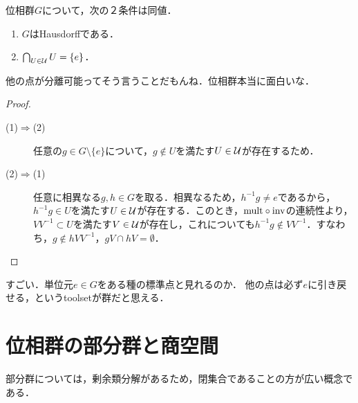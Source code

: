 \documentclass[uplatex,dvipdfmx]{jsreport}
\begin{document}
\begin{proposition}[ハウスドルフ位相群の特徴付け]
    位相群$G$について，次の２条件は同値．
    \begin{enumerate}
        \item $G$はHausdorffである．
        \item $\bigcap_{U\in\mathcal{U}}U=\{e\}$．
    \end{enumerate}
\end{proposition}
\begin{remarks}
    他の点が分離可能ってそう言うことだもんね．位相群本当に面白いな．
\end{remarks}
\begin{proof}\mbox{}
    \begin{description}
        \item[(1)$\Rightarrow$(2)] 任意の$g\in G\setminus\{e\}$について，$g\notin U$を満たす$U\in\mathcal{U}$が存在するため．
        \item[(2)$\Rightarrow$(1)] 任意に相異なる$g,h\in G$を取る．相異なるため，$h^{-1}g\ne e$であるから，$h^{-1}g\in U$を満たす$U\in\mathcal{U}$が存在する．このとき，$\mathrm{mult}\circ\mathrm{inv}$の連続性より，$VV^{-1}\subset U$を満たす$V\in\mathcal{U}$が存在し，これについても$h^{-1}g\notin VV^{-1}$．すなわち，$g\notin hVV^{-1}$，$gV\cap hV=\emptyset$．
    \end{description}
\end{proof}

\begin{itembox}
    すごい．単位元$e\in G$をある種の標準点と見れるのか．
    他の点は必ず$e$に引き戻せる，というtoolsetが群だと思える．
\end{itembox}

\section{位相群の部分群と商空間}

\begin{tcolorbox}[colframe=ForestGreen, colback=ForestGreen!10!white,breakable,colbacktitle=ForestGreen!40!white,coltitle=black,fonttitle=\bfseries\sffamily,
title=]
    部分群については，剰余類分解があるため，閉集合であることの方が広い概念である．
\end{tcolorbox}
\end{document}
